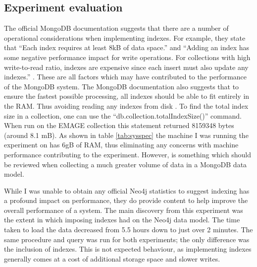 \subsection{Experiment evaluation}\label{experimentdiscussion}
The official MongoDB documentation suggests that there are a number of operational considerations when implementing indexes. For example, they state that ``Each index requires at least 8kB of data space.'' and ``Adding an index has some negative performance impact for write operations. For collections with high write-to-read ratio, indexes are expensive since each insert must also update any indexes.'' \cite{mongdoc}. These are all factors which may have contributed to the performance of the MongoDB system. The MongoDB documentation also suggests that to ensure the fastest possible processing, all indexes should be able to fit entirely in the RAM. Thus avoiding reading any indexes from disk \cite{mongdoc}. To find the total index size in a collection, one can use the ``db.collection.totalIndexSize()'' command. When run on the EMAGE collection this statement returned 8159348 bytes (around 8.1 mB). As shown in table \ref{tab:sysspec} the machine I was running the experiment on has 6gB of RAM, thus eliminating any concerns with machine performance contributing to the experiment. However, is something which should be reviewed when collecting a much greater volume of data in a MongoDB data model.

While I was unable to obtain any official Neo4j statistics to suggest indexing has a profound impact on performance, they do provide content to help improve the overall performance of a system. The main discovery from this experiment was the extent in which imposing indexes had on the Neo4j data model. The time taken to load the data decreased from 5.5 hours down to just over 2 minutes. The same procedure and query was run for both experiments; the only difference was the inclusion of indexes. This is not expected behaviour, as implementing indexes generally comes at a cost of additional storage space and slower writes.

